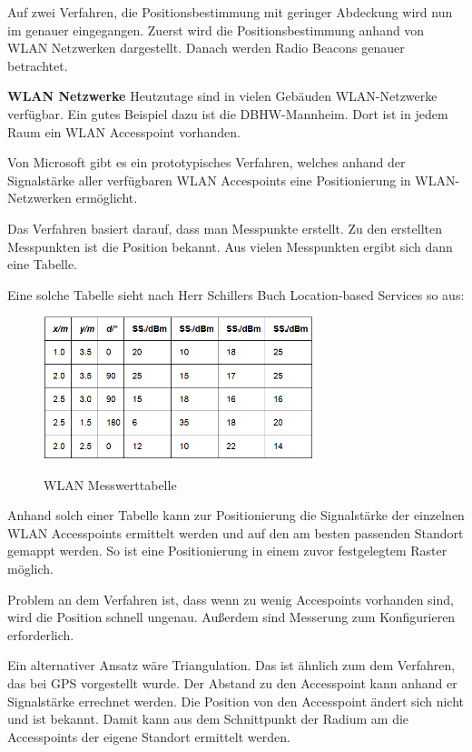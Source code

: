 Auf zwei Verfahren, die Positionsbestimmung mit geringer Abdeckung wird nun im genauer eingegangen. Zuerst wird die Positionsbestimmung anhand von WLAN Netzwerken dargestellt. Danach werden Radio Beacons genauer betrachtet.

\textbf{WLAN Netzwerke}
Heutzutage sind in vielen Gebäuden WLAN-Netzwerke verfügbar. Ein gutes Beispiel dazu ist die DBHW-Mannheim. Dort ist in jedem Raum ein WLAN Accesspoint vorhanden.

Von Microsoft gibt es ein prototypisches Verfahren, welches anhand der Signalstärke aller verfügbaren WLAN Accespoints eine Positionierung in WLAN-Netzwerken ermöglicht. 

Das Verfahren basiert darauf, dass man Messpunkte erstellt. Zu den erstellten Messpunkten ist die Position bekannt. Aus vielen Messpunkten ergibt sich dann eine Tabelle.

Eine solche Tabelle sieht nach Herr Schillers Buch Location-based Services so aus:

\begin{figure}[h]
\centering
\includegraphics[width=0.7\textwidth]{ref/images/WLAN_Tabelle.PNG}
\caption[WLAN Messwerttabelle]{WLAN Messwerttabelle}
\label{fig:DGPS}
\cite[S. 210]{Schiller2004}
\end{figure}

Anhand solch einer Tabelle kann zur Positionierung die Signalstärke der einzelnen WLAN Accesspoints ermittelt werden und auf den am besten passenden Standort gemappt werden. So ist eine Positionierung in einem zuvor festgelegtem Raster möglich.

Problem an dem Verfahren ist, dass wenn zu wenig Accespoints vorhanden sind, wird die Position schnell ungenau. Außerdem sind Messerung zum Konfigurieren erforderlich. 

Ein alternativer Ansatz wäre Triangulation. Das ist ähnlich zum dem Verfahren, das bei GPS vorgestellt wurde. Der Abstand zu den Accesspoint kann anhand er Signalstärke errechnet werden. Die Position von den Accesspoint ändert sich nicht und ist bekannt. Damit kann aus dem Schnittpunkt der Radium am die Accesspoints der eigene Standort ermittelt werden.
\cite[S. 209-211]{Schiller2004}

